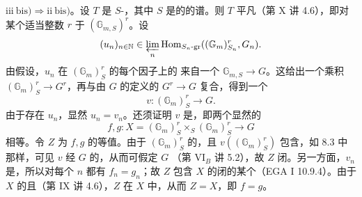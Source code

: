 $\mathrm{iii\ bis)}\Rightarrow\mathrm{ii\ bis)}$。设 $T$ 是 $S$-，其中 $S$ 是的的谱。则 $T$ 平凡（第 X 讲 4.6），即对某个适当整数 $r$ 于 $(\mathbb G_{m,S})^r$。设
\[(u_n)_{n\in\mathbb N}\in\varprojlim_n\operatorname{Hom}_{S_n\text{-}\mathrm{gr}}((\mathbb G_m)^r_{S_n},G_n).\]
由假设，$u_n$ 在 $(\mathbb G_m)^r_S$ 的每个因子上的
来自一个 $\mathbb G_{m,S}\to G$。这给出一个乘积 $(\mathbb G_m)^r_S\to G^r$，再与由 $G$ 的定义的 $G^r\to G$ 复合，得到一个
\[v:(\mathbb G_m)^r_S\longrightarrow G.\]
由于存在 $u_n$，显然 $u_n=v_n$。还须证明 $v$ 是，即两个显然的
\[f,g:X=(\mathbb G_m)^r_S\times_S(\mathbb G_m)^r_S\longrightarrow G\]
相等。令 $Z$ 为 $f,g$ 的等值。由于 $(\mathbb G_m)^r_S$ 的，且 $v((\mathbb G_m)^r_S)$ 包含，如 8.3 中那样，可见 $v$ 经 $G$ 的，从而可假定 $G$ （第 VI$_B$ 讲 5.2），故 $Z$ 闭。另一方面，$v_n$ 是，所以对每个 $n$ 都有 $f_n=g_n$；故 $Z$ 包含 $X$ 的闭的某个（EGA I 10.9.4）。由于 $X$ 的且（第 IX 讲 4.6），$Z$ 在 $X$ 中，从而 $Z=X$，即 $f=g$。

